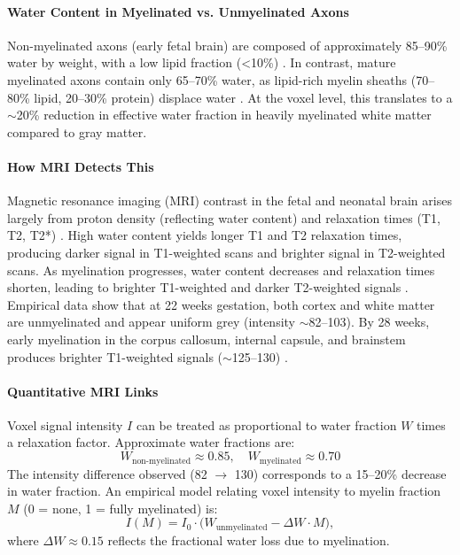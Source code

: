 \documentclass[11pt]{article}
\begin{document}
\paragraph{Water Content in Myelinated vs. Unmyelinated Axons}
Non-myelinated axons (early fetal brain) are composed of approximately 85--90\% water by weight, with a low lipid fraction (<10\%) \citep{koenig1995, alonso2015}. In contrast, mature myelinated axons contain only 65--70\% water, as lipid-rich myelin sheaths (70--80\% lipid, 20--30\% protein) displace water \citep{odrobina2005}. At the voxel level, this translates to a $\sim$20\% reduction in effective water fraction in heavily myelinated white matter compared to gray matter.

\paragraph{How MRI Detects This}
Magnetic resonance imaging (MRI) contrast in the fetal and neonatal brain arises largely from proton density (reflecting water content) and relaxation times (T1, T2, T2*) \citep{welker2012}. High water content yields longer T1 and T2 relaxation times, producing darker signal in T1-weighted scans and brighter signal in T2-weighted scans. As myelination progresses, water content decreases and relaxation times shorten, leading to brighter T1-weighted and darker T2-weighted signals \citep{deoni2011}. Empirical data show that at 22 weeks gestation, both cortex and white matter are unmyelinated and appear uniform grey (intensity $\sim$82--103). By 28 weeks, early myelination in the corpus callosum, internal capsule, and brainstem produces brighter T1-weighted signals ($\sim$125--130) \citep{huppi1998a, huppi1998b}.

\paragraph{Quantitative MRI Links}
Voxel signal intensity $I$ can be treated as proportional to water fraction $W$ times a relaxation factor. Approximate water fractions are:
\begin{equation}
W_{\text{non-myelinated}} \approx 0.85, \quad W_{\text{myelinated}} \approx 0.70
\end{equation}
The intensity difference observed (82 $\to$ 130) corresponds to a 15--20\% decrease in water fraction. An empirical model relating voxel intensity to myelin fraction $M$ (0 = none, 1 = fully myelinated) is:
\begin{equation}
I(M) = I_0 \cdot \big( W_{\text{unmyelinated}} - \Delta W \cdot M \big),
\end{equation}
where $\Delta W \approx 0.15$ reflects the fractional water loss due to myelination.
\end{document}

